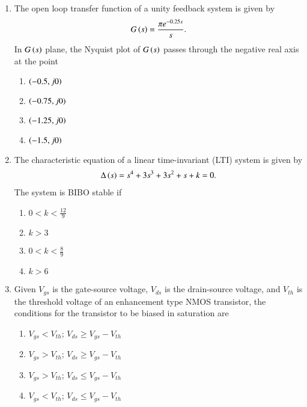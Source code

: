 \documentclass[journal]{IEEEtran}
\begin{document}
\begin{enumerate}
    \item The open loop transfer function of a unity feedback system is given by
    \begin{align*}    
    G\left(s\right) = \frac{\pi e^{-0.25s}}{s}.
    \end{align*}
    In $G\left(s\right)$ plane, the Nyquist plot of $G\left(s\right)$ passes through the negative real axis at the point
    \begin{multicols}{2}
    \begin{enumerate}
        \item $\left(-0.5, j0\right)$
        \item $\left(-0.75, j0\right)$
        \item $\left(-1.25, j0\right)$
        \item $\left(-1.5, j0\right)$
    \end{enumerate}
    \end{multicols}

    \item The characteristic equation of a linear time-invariant (LTI) system is given by
    \begin{align*}
    \Delta\left(s\right) = s^4 + 3s^3 + 3s^2 + s + k = 0.
    \end{align*}
    The system is BIBO stable if
    \begin{multicols}{2}
    \begin{enumerate}
        \item $0 < k < \frac{12}{9}$
        \item $k > 3$
        \item $0 < k < \frac{8}{9}$
        \item $k > 6$
    \end{enumerate}
    \end{multicols}

    \item Given $V_{gs}$ is the gate-source voltage, $V_{ds}$ is the drain-source voltage, and $V_{th}$
    is the threshold voltage of an enhancement type NMOS transistor, the conditions for the transistor
    to be biased in saturation are

    \begin{enumerate}
        \item $V_{gs} < V_{th}$; $V_{ds} \ge V_{gs} - V_{th}$
        \item $V_{gs} > V_{th}$; $V_{ds} \ge V_{gs} - V_{th}$
        \item $V_{gs} > V_{th}$; $V_{ds} \le V_{gs} - V_{th}$
        \item $V_{gs} < V_{th}$; $V_{ds} \le V_{gs} - V_{th}$
    \end{enumerate}

 
\end{enumerate}
\end{document}
